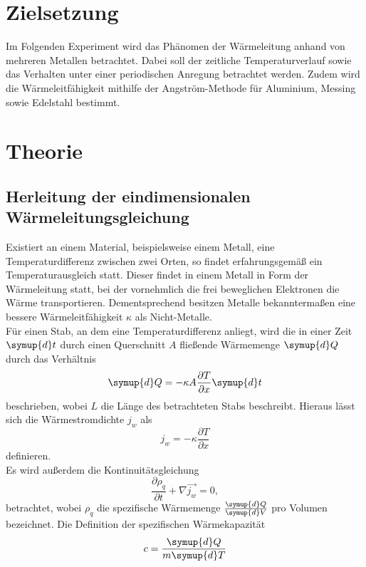 \section{Zielsetzung}
Im Folgenden Experiment wird das Phänomen der Wärmeleitung anhand von mehreren Metallen betrachtet.
Dabei soll der zeitliche Temperaturverlauf sowie das Verhalten unter einer periodischen Anregung betrachtet werden.
Zudem wird die Wärmeleitfähigkeit mithilfe der Angström-Methode für Aluminium, Messing sowie Edelstahl bestimmt.

\section{Theorie}
\subsection{Herleitung der eindimensionalen Wärmeleitungsgleichung}
Existiert an einem Material, beispielsweise einem Metall, eine Temperaturdifferenz zwischen zwei Orten, so findet erfahrungsgemäß ein Temperaturausgleich statt.
Dieser findet in einem Metall in Form der Wärmeleitung statt, bei der vornehmlich die frei beweglichen Elektronen die Wärme transportieren.
Dementsprechend besitzen Metalle bekanntermaßen eine bessere Wärmeleitfähigkeit $\kappa$ als Nicht-Metalle.\\
Für einen Stab, an dem eine Temperaturdifferenz anliegt, wird die in einer Zeit $\symup{d}t$ durch einen Querschnitt $A$ fließende Wärmemenge $\symup{d}Q$ durch das Verhältnis
\begin{equation}
  \symup{d}Q = - \kappa A \frac{\partial T}{\partial x} \symup{d}t
\end{equation}
beschrieben, wobei $L$ die Länge des betrachteten Stabs beschreibt.
Hieraus lässt sich die Wärmestromdichte $j_w$ als
\begin{equation}
  j_w = - \kappa \frac{\partial T}{\partial x}
\end{equation}
definieren.\\
Es wird außerdem die Kontinuitätsgleichung
\begin{equation}
  \frac{\partial \rho_q}{\partial t} + \nabla \vec{j_w} = 0,
\end{equation}
betrachtet, wobei $\rho_q$ die spezifische Wärmemenge $\frac{\symup{d}Q}{\symup{d}V}$ pro Volumen bezeichnet.
Die Definition der spezifischen Wärmekapazität
\begin{equation}
  c = \frac{\symup{d}Q}{m \symup{d}T}
\end{equation}
